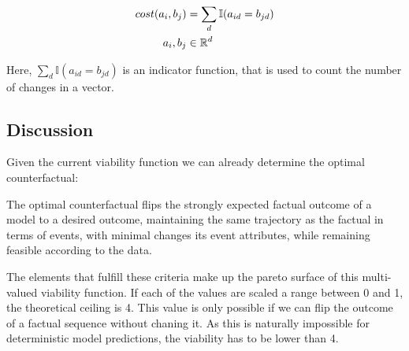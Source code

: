 \documentclass[./../../paper.tex]{subfiles}
\begin{document}
\begin{align}
    \label{eq:sparcity_measure}                          
    cost(a_i, b_j)      & = \sum_d \mathbb{I}(a_{id} = b_{jd})  \\ 
    a_i,b_j        & \in \mathbb{R}^d \nonumber 
\end{align}

\noindent Here, $\sum_d \mathbb{I}(a_{id} = b_{jd})$ is an indicator function, that is used to count the number of changes in a vector.





\subsection{Discussion}
Given the current viability function we can already determine the optimal counterfactual:
\begin{displayquote}
    The optimal counterfactual flips the strongly expected factual outcome of a model to a desired outcome, maintaining the same trajectory as the factual in terms of events, with minimal changes its event attributes, while remaining feasible according to the data.
\end{displayquote}

\noindent The elements that fulfill these criteria make up the pareto surface of this multi-valued viability function. If each of the values are scaled a range between 0 and 1, the theoretical ceiling is 4. This value is only possible if we can flip the outcome of a factual sequence without chaning it. As this is naturally impossible for deterministic model predictions, the viability has to be lower than 4. 
\end{document}
